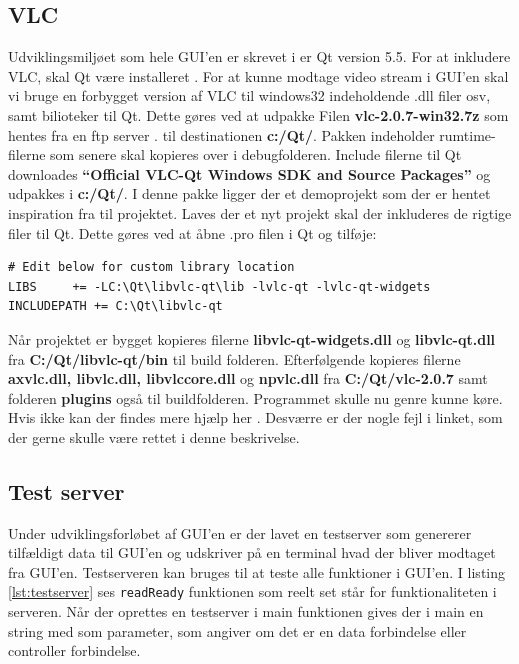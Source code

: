 \subsection{VLC}
Udviklingsmiljøet som hele GUI'en er skrevet i er Qt version 5.5. For at inkludere VLC, skal Qt være installeret \cite{lib:qt}. For at kunne modtage video stream i GUI'en skal vi bruge en forbygget version af VLC til windows32 indeholdende .dll filer osv, samt bilioteker til Qt. Dette gøres ved at udpakke Filen \textbf{vlc-2.0.7-win32.7z} som hentes fra en ftp server \cite{lib:vlc-ftp}. til destinationen \textbf{c:/Qt/}. Pakken indeholder rumtime-filerne som senere skal kopieres over i debugfolderen. Include filerne til Qt downloades \textbf{“Official VLC-Qt Windows SDK and Source Packages”} \cite{lib:vlc-qt} og udpakkes i \textbf{c:/Qt/}. I denne pakke ligger der et demoprojekt som der er hentet inspiration fra til projektet. Laves der et nyt projekt skal der inkluderes de rigtige filer til Qt. Dette gøres ved at åbne .pro filen i Qt og tilføje:

\begin{lstlisting}
# Edit below for custom library location
LIBS     += -LC:\Qt\libvlc-qt\lib -lvlc-qt -lvlc-qt-widgets
INCLUDEPATH += C:\Qt\libvlc-qt
\end{lstlisting}
Når projektet er bygget kopieres filerne \textbf{libvlc-qt-widgets.dll} og \textbf{libvlc-qt.dll} fra \textbf{C:/Qt/libvlc-qt/bin} til build folderen. Efterfølgende kopieres filerne \textbf{axvlc.dll, libvlc.dll, libvlccore.dll} og \textbf{npvlc.dll} fra \textbf{C:/Qt/vlc-2.0.7} samt folderen \textbf{plugins} også til buildfolderen. Programmet skulle nu genre kunne køre. Hvis ikke kan der findes mere hjælp her \cite{lib:vlc-using-qt}. Desværre er der nogle fejl i linket, som der gerne skulle være rettet i denne beskrivelse. 

\clearpage

\subsection{Test server}
Under udviklingsforløbet af GUI'en er der lavet en testserver som genererer tilfældigt data til GUI'en og udskriver på en terminal hvad der bliver modtaget fra GUI'en. Testserveren kan bruges til at teste alle funktioner i GUI'en. I listing \ref{lst:testserver} ses \texttt{readReady} funktionen som reelt set står for funktionaliteten i serveren. Når der oprettes en testserver i main funktionen gives der i main en string med som parameter, som angiver om det er en data forbindelse eller controller forbindelse.



